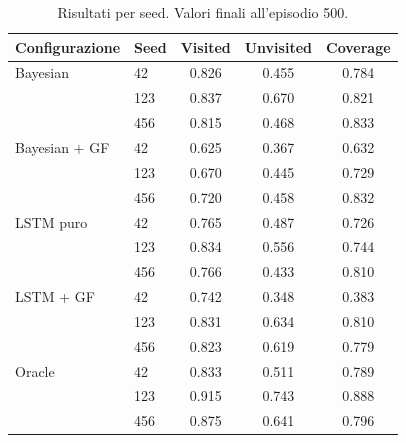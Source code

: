 \begin{table}[ht]
\centering
\small
\caption{Risultati per seed. Valori finali all'episodio 500.}
\label{tab:results_per_seed}
\begin{tabular}{llccc}
\toprule
\textbf{Configurazione} & \textbf{Seed} & \textbf{Visited} & \textbf{Unvisited} & \textbf{Coverage} \\
\midrule
Bayesian & 42 & 0.826 & 0.455 & 0.784 \\
 & 123 & 0.837 & 0.670 & 0.821 \\
 & 456 & 0.815 & 0.468 & 0.833 \\
\midrule
Bayesian + GF & 42 & 0.625 & 0.367 & 0.632 \\
 & 123 & 0.670 & 0.445 & 0.729 \\
 & 456 & 0.720 & 0.458 & 0.832 \\
\midrule
LSTM puro & 42 & 0.765 & 0.487 & 0.726 \\
 & 123 & 0.834 & 0.556 & 0.744 \\
 & 456 & 0.766 & 0.433 & 0.810 \\
\midrule
LSTM + GF & 42 & 0.742 & 0.348 & 0.383 \\
 & 123 & 0.831 & 0.634 & 0.810 \\
 & 456 & 0.823 & 0.619 & 0.779 \\
\midrule
Oracle & 42 & 0.833 & 0.511 & 0.789 \\
 & 123 & 0.915 & 0.743 & 0.888 \\
 & 456 & 0.875 & 0.641 & 0.796 \\
\bottomrule
\end{tabular}
\end{table}